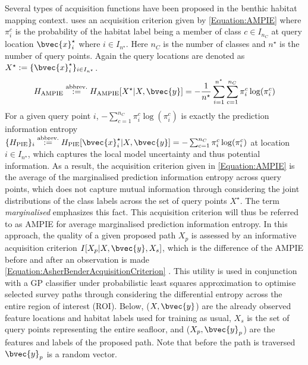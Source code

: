 			Several types of acquisition functions have been proposed in the benthic habitat mapping context. \cite{AsherBender} uses an acquisition criterion given by \eqref{Equation:AMPIE} where $\pi^{c}_{i}$ is the probability of the habitat label being a member of class $c \in I_{n_{C}}$ at query location $\bvec{x}^{\star}_{i}$ where $i \in I_{n^{\star}}$. Here $n_{C}$ is the number of classes and $n^{\star}$ is the number of query points. Again the query locations are denoted as $X^{\star} := \{\bvec{x}^{\star}_{i}\}_{i \in I_{n^{\star}}}$. \begin{equation}
				H_{\mathrm{AMPIE}} \stackrel{\text{abbrev.}}{:=} H_{\mathrm{AMPIE}}[X^{\star} | X, \bvec{y}] = - \frac{1}{n^{\star}} \sum_{i = 1}^{n^{\star}} \sum_{c = 1}^{n_{C}} \pi^{c}_{i} \log(\pi^{c}_{i})
			\label{Equation:AMPIE}
			\end{equation} For a given query point $i$, $- \sum_{c = 1}^{n_{C}} \pi^{c}_{i} \log(\pi^{c}_{i})$ is exactly the prediction information entropy $\{H_{\mathrm{PIE}}\}_{i} \stackrel{\text{abbrev.}}{:=} H_{\mathrm{PIE}}[\bvec{x}^{\star}_{i} | X, \bvec{y}] = - \sum_{c = 1}^{n_{C}} \pi^{c}_{i} \log(\pi^{c}_{i})$ at location $i \in I_{n^{\star}}$, which captures the local model uncertainty and thus potential information. As a result, the acquisition criterion given in \eqref{Equation:AMPIE} is the average of the marginalised prediction information entropy across query points, which does not capture mutual information through considering the joint distributions of the class labels across the set of query points $X^{\star}$. The term \textit{marginalised} emphasizes this fact. This acquisition criterion will thus be referred to as AMPIE for average marginalised prediction information entropy. In this approach, the quality of a given proposed path $X_{p}$ is assessed by an informative acquisition criterion $I[X_{p} | X, \bvec{y}, X_{s}]$, which is the difference of the AMPIE before and after an observation is made \eqref{Equation:AsherBenderAcquisitionCriterion} \citep{Rigby:ROB20372}. This utility is used in conjunction with a GP classifier under probabilistic least squares approximation to optimise selected survey paths through considering the differential entropy across the entire region of interest (ROI). Below, ($X, \bvec{y}$) are the already observed feature locations and habitat labels used for training as usual, $X_{s}$ is the set of query points representing the entire seafloor, and ($X_{p}, \bvec{y}_{p}$) are the features and labels of the proposed path. Note that before the path is traversed $\bvec{y}_{p}$ is a random vector. \begin{equation}

\end{equation}

